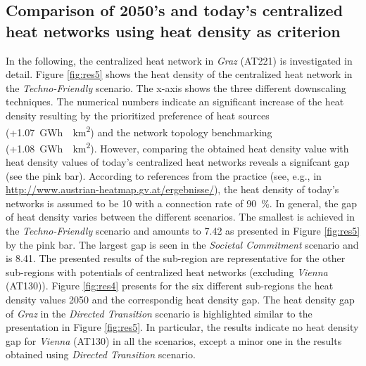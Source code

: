 \subsection{Comparison of 2050's and today's centralized heat networks using heat density as criterion}\label{res:5}
In the following, the centralized heat network in \textit{Graz} (AT221) is investigated in detail. Figure \ref{fig:res5} shows the heat density of the centralized heat network in the \textit{Techno-Friendly} scenario. The x-axis shows the three different downscaling techniques. The numerical numbers indicate an significant increase of the heat density resulting by the prioritized preference of heat sources (+\SI{1.07}{GWh \per km^2}) and the network topology benchmarking (+\SI{1.08}{GWh \per km^2}). However, comparing the obtained heat density value with heat density values of today's centralized heat networks reveals a signifcant gap (see the pink bar). According to references from the practice (see, e.g., in \url{http://www.austrian-heatmap.gv.at/ergebnisse/}), the heat density of today's networks is assumed to be \SI{10}{} with a connection rate of \SI{90}{\%}. In general, the gap of heat density varies between the different scenarios. The smallest is achieved in the \textit{Techno-Friendly} scenario and amounts to \SI{7.42}{} as presented in Figure \ref{fig:res5} by the pink bar. The largest gap is seen in the \textit{Societal Commitment} scenario and is \SI{8.41}{}. The presented results of the sub-region are representative for the other sub-regions with potentials of centralized heat networks (excluding \textit{Vienna} (AT130)). Figure \ref{fig:res4} presents for the six different sub-regions the heat density values 2050 and the correspondig heat density gap. The heat density gap of \textit{Graz} in the \textit{Directed Transition} scenario is highlighted similar to the presentation in Figure \ref{fig:res5}. In particular, the results indicate no heat density gap for \textit{Vienna} (AT130) in all the scenarios, except a minor one in the results obtained using \textit{Directed Transition} scenario.  


